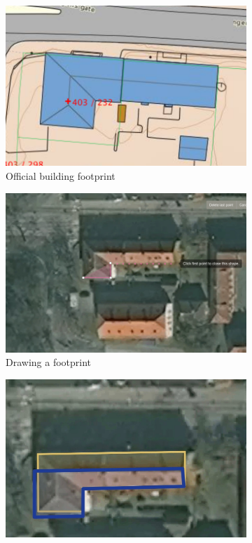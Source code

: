 \begin{figure}[H]
	\centering
	\begin{subfigure}[b]{0.32\textwidth}
		\centering
		\includegraphics[width=\linewidth]{fig/build1}
		\caption{Official building footprint}
		\label{fig:build1}
	\end{subfigure}
	\begin{subfigure}[b]{0.32\textwidth}
		\centering
		\includegraphics[width=\linewidth]{fig/build2}
		\caption{Drawing a footprint}
		\label{fig:build2}
	\end{subfigure}
	\begin{subfigure}[b]{0.32\textwidth}
		\centering
		\includegraphics[width=\linewidth]{fig/build3}

\end{subfigure}
\end{figure}
